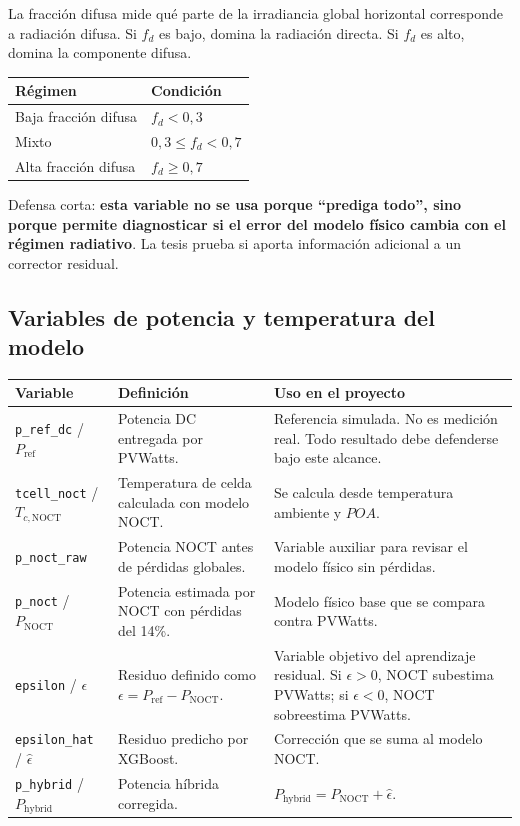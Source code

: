 \documentclass[11pt, letterpaper]{article}
\newcommand{\fd}{f_d}
\newcommand{\pnoct}{P_{\mathrm{NOCT}}}
\newcommand{\pref}{P_{\mathrm{ref}}}
\newcommand{\phybrid}{P_{\mathrm{hybrid}}}
\begin{document}
La fracci\'on difusa mide qu\'e parte de la irradiancia global horizontal corresponde a radiaci\'on difusa. Si \(\fd\) es bajo, domina la radiaci\'on directa. Si \(\fd\) es alto, domina la componente difusa.

\begin{center}
\begin{tabular}{ll}
\toprule
\textbf{R\'egimen} & \textbf{Condici\'on} \\
\midrule
Baja fracci\'on difusa & \(\fd < 0{,}3\) \\
Mixto & \(0{,}3 \leq \fd < 0{,}7\) \\
Alta fracci\'on difusa & \(\fd \geq 0{,}7\) \\
\bottomrule
\end{tabular}
\end{center}

Defensa corta: \textbf{esta variable no se usa porque ``prediga todo'', sino porque permite diagnosticar si el error del modelo f\'isico cambia con el r\'egimen radiativo}. La tesis prueba si aporta informaci\'on adicional a un corrector residual.

\subsection{Variables de potencia y temperatura del modelo}

\begin{longtable}{p{3.2cm}p{5.6cm}p{5.4cm}}
\toprule
\textbf{Variable} & \textbf{Definici\'on} & \textbf{Uso en el proyecto} \\
\midrule
\endhead
\texttt{p\_ref\_dc} / \(\pref\) & Potencia DC entregada por PVWatts. & Referencia simulada. No es medici\'on real. Todo resultado debe defenderse bajo este alcance. \\
\texttt{tcell\_noct} / \(T_{c,\mathrm{NOCT}}\) & Temperatura de celda calculada con modelo NOCT. & Se calcula desde temperatura ambiente y \(POA\). \\
\texttt{p\_noct\_raw} & Potencia NOCT antes de p\'erdidas globales. & Variable auxiliar para revisar el modelo f\'isico sin p\'erdidas. \\
\texttt{p\_noct} / \(\pnoct\) & Potencia estimada por NOCT con p\'erdidas del 14\%. & Modelo f\'isico base que se compara contra PVWatts. \\
\texttt{epsilon} / \(\epsilon\) & Residuo definido como \(\epsilon = \pref-\pnoct\). & Variable objetivo del aprendizaje residual. Si \(\epsilon>0\), NOCT subestima PVWatts; si \(\epsilon<0\), NOCT sobreestima PVWatts. \\
\texttt{epsilon\_hat} / \(\widehat{\epsilon}\) & Residuo predicho por XGBoost. & Correcci\'on que se suma al modelo NOCT. \\
\texttt{p\_hybrid} / \(\phybrid\) & Potencia h\'ibrida corregida. & \(\phybrid = \pnoct + \widehat{\epsilon}\). \\
\bottomrule
\end{longtable}
\end{document}
